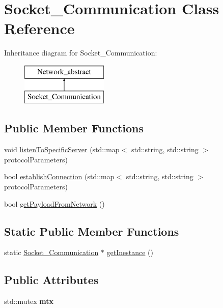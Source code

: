 \hypertarget{class_socket___communication}{}\section{Socket\+\_\+\+Communication Class Reference}
\label{class_socket___communication}
Inheritance diagram for Socket\+\_\+\+Communication\+:\begin{figure}[H]
\begin{center}
\leavevmode
\includegraphics[height=2.000000cm]{class_socket___communication}
\end{center}
\end{figure}
\subsection*{Public Member Functions}
\begin{DoxyCompactItemize}
\item 
void \mbox{\hyperlink{class_socket___communication_a9a405d090685fd6ba13bd857802bd591}{listen\+To\+Specific\+Server}} (std\+::map$<$ std\+::string, std\+::string $>$ protocol\+Parameters)
\item 
bool \mbox{\hyperlink{class_socket___communication_a4f1352ef7ad4831c6d14472865907429}{establish\+Connection}} (std\+::map$<$ std\+::string, std\+::string $>$ protocol\+Parameters)
\item 
bool \mbox{\hyperlink{class_socket___communication_ab2983a743859588e4a1ca18a710d3fc9}{get\+Payload\+From\+Network}} ()
\end{DoxyCompactItemize}
\subsection*{Static Public Member Functions}
\begin{DoxyCompactItemize}
\item 
static \mbox{\hyperlink{class_socket___communication}{Socket\+\_\+\+Communication}} $\ast$ \mbox{\hyperlink{class_socket___communication_a7e156c8010a798636b637262adb1e38f}{get\+Inestance}} ()
\end{DoxyCompactItemize}
\subsection*{Public Attributes}
\begin{DoxyCompactItemize}
\item 
\mbox{\label{class_socket___communication_ab79b3366e67b983a5b8b7e510143048c}} 
std\+::mutex {\bfseries mtx}
\end{DoxyCompactItemize}
